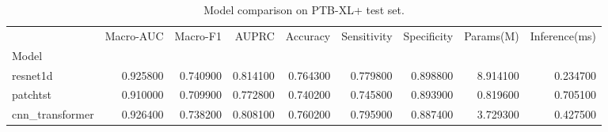 \begin{table}
\caption{Model comparison on PTB-XL+ test set.}
\label{tab:comparison}
\begin{tabular}{lrrrrrrrr}
\toprule
 & Macro-AUC & Macro-F1 & AUPRC & Accuracy & Sensitivity & Specificity & Params(M) & Inference(ms) \\
Model &  &  &  &  &  &  &  &  \\
\midrule
resnet1d & 0.925800 & 0.740900 & 0.814100 & 0.764300 & 0.779800 & 0.898800 & 8.914100 & 0.234700 \\
patchtst & 0.910000 & 0.709900 & 0.772800 & 0.740200 & 0.745800 & 0.893900 & 0.819600 & 0.705100 \\
cnn_transformer & 0.926400 & 0.738200 & 0.808100 & 0.760200 & 0.795900 & 0.887400 & 3.729300 & 0.427500 \\
\bottomrule
\end{tabular}
\end{table}
